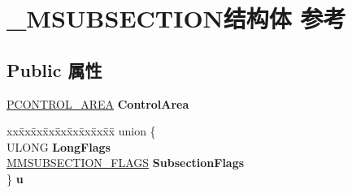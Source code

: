 \hypertarget{struct___m_s_u_b_s_e_c_t_i_o_n}{}\section{\+\_\+\+M\+S\+U\+B\+S\+E\+C\+T\+I\+O\+N结构体 参考}
\label{struct___m_s_u_b_s_e_c_t_i_o_n}
\subsection*{Public 属性}
\begin{DoxyCompactItemize}
\item 
\mbox{\label{struct___m_s_u_b_s_e_c_t_i_o_n_a0a48ab11c970d164f60e587e7dbad077}} 
\hyperlink{struct___c_o_n_t_r_o_l___a_r_e_a}{P\+C\+O\+N\+T\+R\+O\+L\+\_\+\+A\+R\+EA} {\bfseries Control\+Area}
\item 
\mbox{\label{struct___m_s_u_b_s_e_c_t_i_o_n_ad036f9fe6c9c002e1847e0e5bd2054a5}} 
\begin{tabbing}
xx\=xx\=xx\=xx\=xx\=xx\=xx\=xx\=xx\=\kill
union \{\\
\>ULONG {\bfseries LongFlags}\\
\>\hyperlink{struct___m_m_s_u_b_s_e_c_t_i_o_n___f_l_a_g_s}{MMSUBSECTION\_FLAGS} {\bfseries SubsectionFlags}\\
\} {\bfseries u}\\


\end{tabbing}
\end{DoxyCompactItemize}
